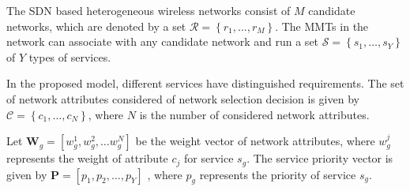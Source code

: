 \documentclass[conference]{IEEEtran}
\begin{document}
The SDN based heterogeneous wireless networks consist of $M$ candidate networks, which are denoted by a set $\mathcal{R} =\left\{ {r}_1,\ldots ,r_{ M} \right\}$. The MMTs in the  network can associate with any candidate network and run a set $\mathcal{S}=\left\{s_1,\ldots,s_{Y} \right\}$  of $Y$ types of services.
\begin{comment}   
	\label{equ01}
	 R=\left\{ r_1,\ldots ,r_{ M} \right\}, M\geq 2 ,
\end{comment}
In the proposed model, different services have distinguished requirements.  
  The set of network attributes considered of network selection decision is given by $\mathcal{C}=\left\{c_1,\ldots,c_N\right\}$, where $N$ is the number of considered network attributes. 
\begin{comment}   
	\begin{equation}   
	\label{equ02}
	S=\left\{s_1,\ldots,s_{Y} \right\}, Y \geq 1,
	\end{equation}
	\begin{equation}   
	\label{equ03}
	C=\left\{c_1,\ldots,c_N\right\}, N \geq 2,
	\end{equation}
\end{comment}	
Let $\boldsymbol{W}_{g} = [w^1_{g}, w^2_{g},\dots w^N_{g} ]$  be the weight vector of  network attributes, where $ w^j_{g} $ represents the weight  of attribute $c_{j}$ for service $s_{g}$. The service priority vector is given by $ \boldsymbol{P} =  [p_{1},p_{2},\dots,p_{Y}] $ , where $p_g$ represents the priority of service $s_g$.
\end{document}
